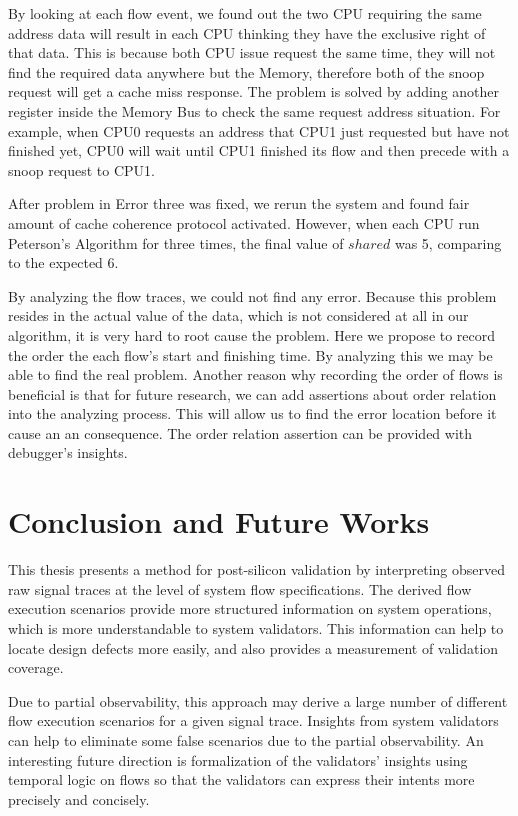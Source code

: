 \documentclass[12pt,frontmatter,copyright,thesis]{usfmanus}
\begin{document}
By looking at each flow event, we found out the two CPU requiring the same address data will
result in each CPU thinking they have the exclusive right of that data.
This is because both CPU issue request the same time, they will not 
find the required data anywhere but the Memory, therefore both of the snoop request
will get a cache miss response. 
The problem is solved by adding another register inside the Memory Bus to check
the same request address situation. For example,
when CPU0 requests an address that CPU1
just requested but have not finished yet, CPU0 will wait until CPU1
finished its flow and then precede with a snoop request to CPU1.

 
 After problem in Error three was fixed, we rerun the system and found fair amount of
 cache coherence protocol activated. However, when each CPU run Peterson's Algorithm
 for three times, the final value of $shared$ was 5, comparing to the expected 6.
 
 By analyzing the flow traces, we could not find any error. Because this problem
 resides in the actual value of the data, which is not considered at all in our algorithm,
 it is very hard to root cause the problem. Here we propose to record the order
 the each flow's start and finishing time. By analyzing this we may be able to
 find the real problem. Another reason why recording the order of flows is beneficial
 is that for future research, we can add assertions about order relation into the analyzing
 process. This will allow us to find the error location before it cause an an consequence.
 The order relation assertion can be provided with debugger's insights.
 

\chapter{Conclusion and Future Works}
This thesis presents a method for post-silicon validation by
interpreting observed raw signal traces at the level of
system flow specifications.  The derived flow execution
scenarios provide more structured information on system
operations, which is more understandable to system
validators.  This information can help to locate design
defects more easily, and also provides a measurement of
validation coverage.

Due to partial observability, this approach may derive a
large number of different flow execution scenarios for a
given signal trace.  Insights from system validators can
help to eliminate some false scenarios due to the partial
observability.  An interesting future direction is
formalization of the validators' insights using temporal
logic on flows so that the validators can express their
intents more precisely and concisely.
\end{document}
